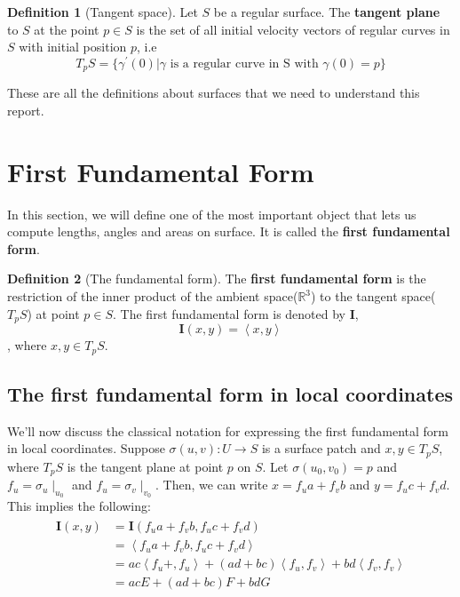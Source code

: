 \documentclass{article}
\theoremstyle{plain}
\theoremstyle{definition}
\newtheorem{definition}{Definition}
\theoremstyle{remark}
\newcommand{\R}{\mathbb{R}}
\begin{document}
\begin{definition}[Tangent space]
    Let \(S\) be a regular surface. The \textbf{tangent plane} to \(S\) at the point \( p \in S\) is the set of all initial velocity vectors of regular curves in \(S\) with initial position \(p\), i.e \[ T_pS = \{ \gamma^\prime(0) | \gamma \text{ is a regular curve in S with }\gamma(0) = p\} \]
\end{definition}

These are all the definitions about surfaces that we need to understand this report.

\section{First Fundamental Form}
In this section, we will define one of the most important object that lets us compute lengths, angles and areas on surface. It is called the \textbf{first fundamental form}.

\begin{definition}[The fundamental form]
    The \textbf{first fundamental form} is the restriction of the inner product of the ambient space(\(\R^3\)) to the tangent space(\( T_pS\)) at point \( p \in S\). The first fundamental form is denoted by \( \mathbf{I} \), \[ \mathbf{I}(x,y) = \left\langle x,y\right\rangle  \], where \( x,y \in T_pS\).
\end{definition}

\subsection{The first fundamental form in local coordinates} \label{ssec: The first fundamental form in local coordinates}
We'll now discuss the classical notation for expressing the first fundamental form in local coordinates. Suppose \( \sigma(u,v): U \rightarrow S\) is a surface patch and \( x,y \in T_pS \), where \(T_pS\) is the tangent plane at point \(p\) on \(S\). Let \( \sigma(u_0, v_0) = p \) and \( f_u = \sigma_u \mid_{u_0} \) and \( f_u = \sigma_v \mid_{v_0} \). Then, we can write \(x =  f_u a + f_v b\) and \( y =  f_u c + f_v d\). This implies the following:
\begin{align}
    \begin{split}
        \mathbf{I}(x,y) & = \mathbf{I}( f_u a + f_v b,  f_u c + f_v d) \\
        & = \left\langle f_u a + f_v b,  f_u c + f_v d \right\rangle \\
        & = ac\left\langle  f_u  +,  f_u  \right\rangle + (ad+bc)\left\langle  f_u  , f_v  \right\rangle + bd \left\langle f_v , f_v  \right\rangle \\
        & = ac E + (ad+bc)F + bd G
    \end{split}
\end{align}
\end{document}
